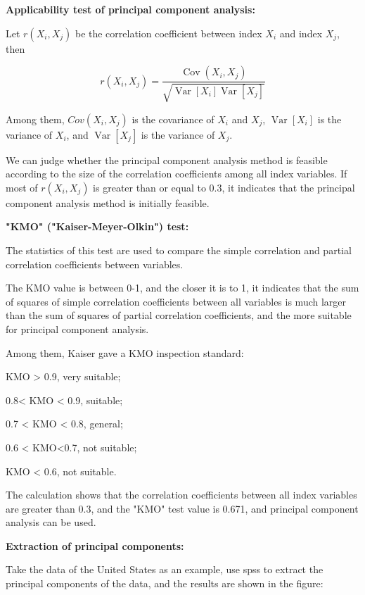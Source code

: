 \documentclass[12pt]{article}  %
\begin{document}
\textbf{Applicability test of principal component analysis:}

Let $r\left(X_{i}, X_{j}\right)$ be the correlation coefficient between index $X_{i}$ and index $X_{j}$, then

\begin{equation}\label{eq:eq2}r\left(X_{i}, X_{j}\right)=\frac{\operatorname{Cov}\left(X_{i}, X_{j}\right)}{\sqrt{\operatorname{Var}\left[X_{i}\right] \operatorname{Var}\left[X_{j}\right]}}\end{equation}

Among them, $Cov\left(X_{i}, X_{j}\right)$ is the covariance of $X_{i}$ and $X_{j}$, $\operatorname{Var}\left[X_{i}\right]$ is the variance of $X_{i}$, and $\operatorname{Var}\left[X_{j}\right]$ is the variance of $X_{j}$.

We can judge whether the principal component analysis method is feasible according to the size of the correlation coefficients among all index variables. If most of  $r\left(X_{i}, X_{j}\right)$  is greater than or equal to 0.3, it indicates that the principal component analysis method is initially feasible.

\textbf{"KMO" ("Kaiser-Meyer-Olkin") test:}

The statistics of this test are used to compare the simple correlation and partial correlation coefficients between variables.

The KMO value is between 0-1, and the closer it is to 1, it indicates that the sum of squares of simple correlation coefficients between all variables is much larger than the sum of squares of partial correlation coefficients, and the more suitable for principal component analysis.

Among them, Kaiser gave a KMO inspection standard:

KMO > 0.9, very suitable;

0.8< KMO < 0.9, suitable; 

0.7 < KMO < 0.8, general; 

0.6 < KMO<0.7, not suitable; 

KMO < 0.6, not suitable.


The calculation shows that the correlation coefficients between all index variables are greater than 0.3, and the "KMO" test value is 0.671, and principal component analysis can be used.

\textbf{Extraction of principal components:}

Take the data of the United States as an example, use spss to extract the principal components of the data, and the results are shown in the figure:
\end{document}
